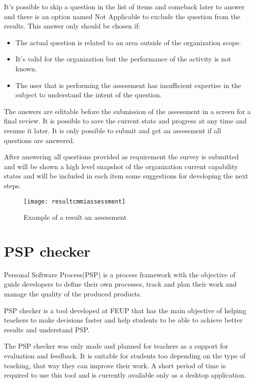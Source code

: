 It's possible to skip a question in the list of items and comeback later to answer and there is an option named Not Applicable to exclude the question from the results. This answer only should be chosen if:
\begin{itemize}
	\item The actual question is related to an area outside of the organization scope.
	\item It's valid for the organization but the  performance of the activity is not known.
	\item The user that is performing the assessment has insufficient expertise in the subject to understand the intent of the question.
\end{itemize}

The answers are editable before the submission of the assessment in a screen for a final review. It is possible to save the current state and progress at any time and resume it later. It is only possible to submit and get an assessment if all questions are answered.

After answering all questions provided as requirement the survey is submitted and will be shown a high level snapshot of the organization  current capability states and will be included in each item some suggestions for developing the next steps.

\newpage

\begin{figure}[h]
	\begin{center}
		\leavevmode
		\texttt{[image: resultcmmiassessment]}
		\caption{Example of a result an assessment}
		\label{fig:assesment_result}
	\end{center}
\end{figure}


\section{PSP checker}

Personal Software Process(PSP) \citep{humphrey2005psp} is a process framework with the objective of guide developers to define their own processes, track and plan their work and manage the quality of the produced products.

PSP checker\citep{Pinto2010} is a tool developed at FEUP that has the main objective of helping teachers to make decisions faster and help students to be able to achieve better results and understand PSP.

The PSP checker was only made and planned for teachers as a support for evaluation and feedback. It is suitable for students too depending on the type of teaching, that way they can improve their work. A short period of time is required to use this tool and is currently available only as a desktop application.


